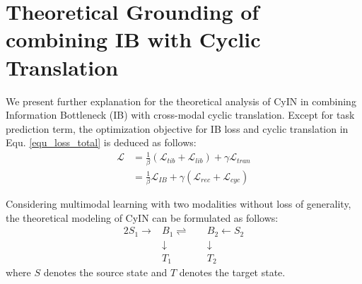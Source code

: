 \documentclass{article}
\begin{document}


\section{Theoretical Grounding of combining IB with Cyclic Translation} 
We present further explanation for the theoretical analysis of CyIN in combining Information Bottleneck (IB) with cross-modal cyclic  translation. Except for task prediction term, the optimization objective for IB loss and cyclic translation in Equ. \ref{equ_loss_total} is deduced as follows:
\begin{equation}
\begin{aligned}
\mathcal{L} &= \frac{1}{\beta}(\mathcal{L}_{tib}+\mathcal{L}_{lib})+\gamma \mathcal{L}_{tran} \\
&= \frac{1}{\beta}\mathcal{L}_{IB}+\gamma (\mathcal{L}_{rec}+\mathcal{L}_{cyc})
\end{aligned}
\end{equation}

Considering multimodal learning with two modalities without loss of generality, the theoretical modeling of CyIN can be formulated as follows:
\begin{alignat*}{2}
    S_1 \rightarrow & B_1 \rightleftharpoons\  &&B_2  \leftarrow S_2 \\
    &\downarrow &&\downarrow \\
    &T_1 &&T_2
\end{alignat*}
where $S$ denotes the source state and $T$ denotes the target state. 
\end{document}
